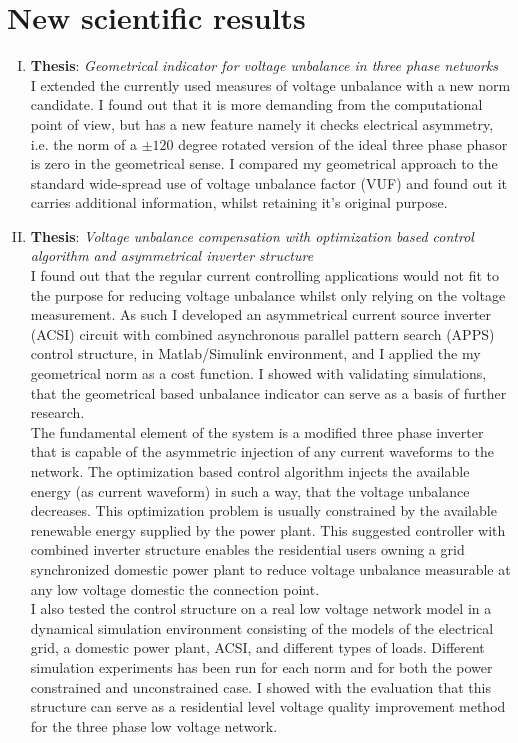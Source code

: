 \section{New scientific results}

\begin{enumerate}[I.)]

\item\textbf{Thesis}: \emph{Geometrical indicator for voltage unbalance in three phase networks}\\
    I extended the currently used measures of voltage unbalance with a new norm candidate. I found out that it is more demanding from the computational point of view, but has a new feature namely it checks electrical asymmetry, i.e. the norm of a $\pm120$ degree rotated version of the ideal three phase phasor is zero in the geometrical sense. I compared my geometrical approach to the standard wide-spread use of voltage unbalance factor (VUF) and found out it carries additional information, whilst retaining it's original purpose.\\
		
\item\textbf{Thesis}: \emph{Voltage unbalance compensation with optimization based control algorithm and asymmetrical inverter structure}\\
     I found out that the regular current controlling applications would not fit to the purpose for reducing voltage unbalance whilst only relying on the voltage measurement. As such I developed an asymmetrical current source inverter (ACSI) circuit with combined asynchronous parallel pattern search (APPS) control structure, in Matlab/Simulink environment, and I applied the my geometrical norm as a cost function. I showed with validating simulations, that the geometrical based unbalance indicator can serve as a basis of further research. \\
		The fundamental element of the system is a modified three phase inverter that is capable of the asymmetric injection of any current waveforms to the network. The optimization based control algorithm injects the available energy (as current waveform) in such a way, that the voltage unbalance decreases. This optimization problem is usually constrained by the available renewable energy supplied by the power plant. This suggested controller with combined inverter structure enables the residential users owning a grid synchronized domestic power plant to reduce voltage unbalance measurable at any low voltage domestic the connection point. \\
    I also tested the control structure on a real low voltage network model in a dynamical simulation environment consisting of the models of the electrical grid, a domestic power plant, ACSI, and different types of loads. Different simulation experiments has been run for each norm and for both the power constrained and unconstrained case. I showed with the evaluation that this structure can serve as a residential level voltage quality improvement method for the three phase low voltage network.\\
		

\end{enumerate}
